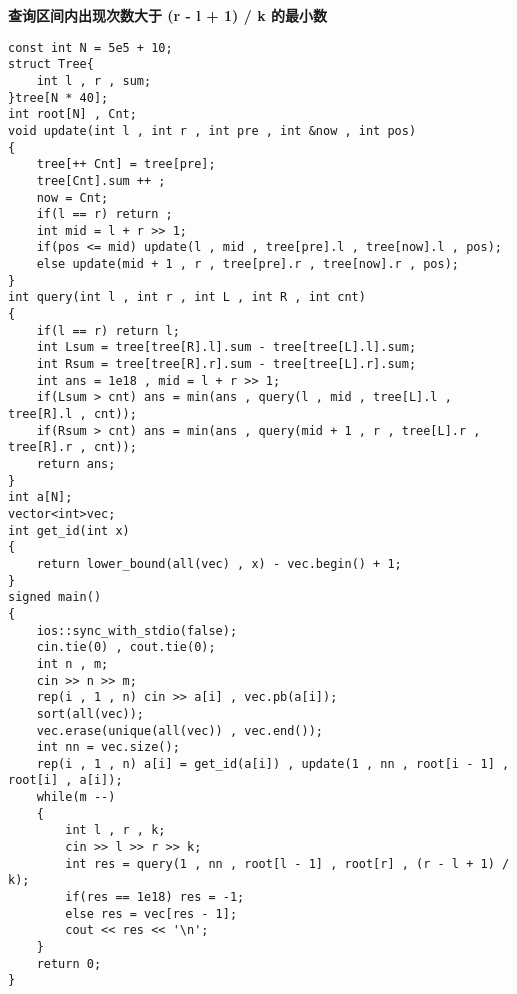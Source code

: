 \documentclass[E:/GsjzTle/main/main.tex]{subfiles}
\begin{document}
\textbf{查询区间内出现次数大于 (r - l + 1) / k 的最小数}

\begin{lstlisting}
const int N = 5e5 + 10;
struct Tree{
	int l , r , sum;
}tree[N * 40];
int root[N] , Cnt;
void update(int l , int r , int pre , int &now , int pos)
{
	tree[++ Cnt] = tree[pre];
	tree[Cnt].sum ++ ;
	now = Cnt;
	if(l == r) return ;
	int mid = l + r >> 1;
	if(pos <= mid) update(l , mid , tree[pre].l , tree[now].l , pos);
	else update(mid + 1 , r , tree[pre].r , tree[now].r , pos);
}
int query(int l , int r , int L , int R , int cnt)
{
	if(l == r) return l;
	int Lsum = tree[tree[R].l].sum - tree[tree[L].l].sum;
	int Rsum = tree[tree[R].r].sum - tree[tree[L].r].sum;
	int ans = 1e18 , mid = l + r >> 1;
	if(Lsum > cnt) ans = min(ans , query(l , mid , tree[L].l , tree[R].l , cnt));
	if(Rsum > cnt) ans = min(ans , query(mid + 1 , r , tree[L].r , tree[R].r , cnt));
	return ans;
}
int a[N];
vector<int>vec;
int get_id(int x)
{
	return lower_bound(all(vec) , x) - vec.begin() + 1;
}
signed main()
{
	ios::sync_with_stdio(false);
	cin.tie(0) , cout.tie(0);
	int n , m;
	cin >> n >> m;
	rep(i , 1 , n) cin >> a[i] , vec.pb(a[i]);
	sort(all(vec));
	vec.erase(unique(all(vec)) , vec.end());
	int nn = vec.size();
	rep(i , 1 , n) a[i] = get_id(a[i]) , update(1 , nn , root[i - 1] , root[i] , a[i]);
	while(m --)
	{
		int l , r , k;
		cin >> l >> r >> k;
		int res = query(1 , nn , root[l - 1] , root[r] , (r - l + 1) / k);
		if(res == 1e18) res = -1;
		else res = vec[res - 1];
		cout << res << '\n';
	}
	return 0;
} 
\end{lstlisting}
\end{document}
